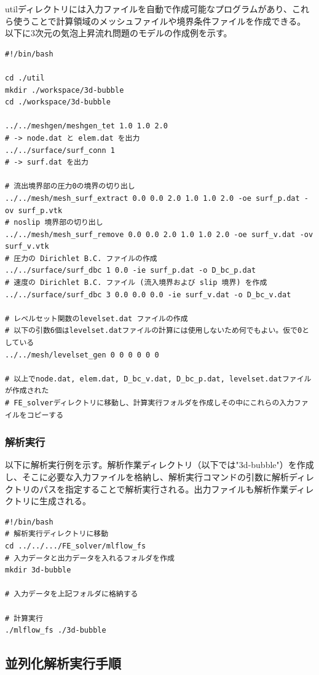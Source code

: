 \documentclass[8pt,a4paper]{article}
\begin{document}
utilディレクトリには入力ファイルを自動で作成可能なプログラムがあり、これら使うことで計算領域のメッシュファイルや境界条件ファイルを作成できる。
以下に3次元の気泡上昇流れ問題のモデルの作成例を示す。
\begin{lstlisting}[]
#!/bin/bash

cd ./util
mkdir ./workspace/3d-bubble
cd ./workspace/3d-bubble

../../meshgen/meshgen_tet 1.0 1.0 2.0
# -> node.dat と elem.dat を出力
../../surface/surf_conn 1
# -> surf.dat を出力

# 流出境界部の圧力0の境界の切り出し
../../mesh/mesh_surf_extract 0.0 0.0 2.0 1.0 1.0 2.0 -oe surf_p.dat -ov surf_p.vtk
# noslip 境界部の切り出し
../../mesh/mesh_surf_remove 0.0 0.0 2.0 1.0 1.0 2.0 -oe surf_v.dat -ov surf_v.vtk
# 圧力の Dirichlet B.C. ファイルの作成
../../surface/surf_dbc 1 0.0 -ie surf_p.dat -o D_bc_p.dat
# 速度の Dirichlet B.C. ファイル (流入境界および slip 境界) を作成
../../surface/surf_dbc 3 0.0 0.0 0.0 -ie surf_v.dat -o D_bc_v.dat

# レベルセット関数のlevelset.dat ファイルの作成
# 以下の引数6個はlevelset.datファイルの計算には使用しないため何でもよい。仮で0としている
../../mesh/levelset_gen 0 0 0 0 0 0

# 以上でnode.dat, elem.dat, D_bc_v.dat, D_bc_p.dat, levelset.datファイルが作成された
# FE_solverディレクトリに移動し、計算実行フォルダを作成しその中にこれらの入力ファイルをコピーする
\end{lstlisting}

\subsubsection{解析実行}

以下に解析実行例を示す。解析作業ディレクトリ（以下では"3d-bubble"）を作成し、そこに必要な入力ファイルを格納し、解析実行コマンドの引数に解析ディレクトリのパスを指定することで解析実行される。出力ファイルも解析作業ディレクトリに生成される。
\begin{lstlisting}[]
#!/bin/bash
# 解析実行ディレクトリに移動
cd ../../.../FE_solver/mlflow_fs
# 入力データと出力データを入れるフォルダを作成
mkdir 3d-bubble

# 入力データを上記フォルダに格納する

# 計算実行
./mlflow_fs ./3d-bubble
\end{lstlisting}

\subsection{並列化解析実行手順}
\end{document}

